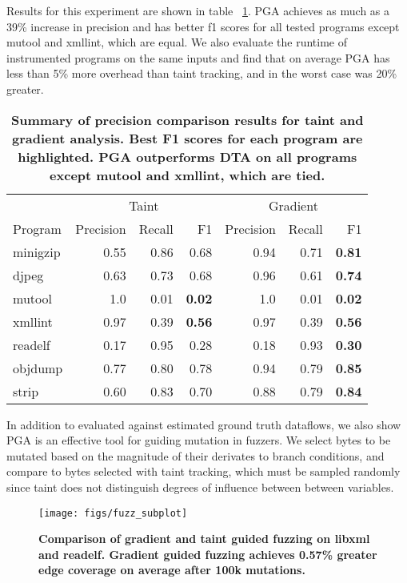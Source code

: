 \documentclass[conference]{IEEEtran}
\newcommand{\ttbf}[1]  {{\ttfamily\fontseries{m}\selectfont #1}}
\begin{document}
  Results for this experiment are shown in table ~\ref{tab:precision_comp}. PGA achieves as much as a 39\% increase in precision and has better f1 scores for all tested programs except \ttbf{mutool} and \ttbf{xmllint}, which are equal. We also evaluate the runtime of instrumented programs on the same inputs and find that on average PGA has less than 5\% more overhead than taint tracking, and in the worst case was 20\% greater.


\begin{table}
{\small
  \begin{tabular}{p{0.9cm}rrrrrr} 
 \toprule
     & \multicolumn{3}{c}{Taint} & \multicolumn{3}{c}{Gradient} \\ 
    Program & Precision & Recall & F1 & Precision & Recall & F1 \\ 
 \midrule
minigzip &0.55& 0.86 &0.68& 0.94& 0.71 & {\bf 0.81}\\ 
djpeg &0.63&0.73&0.68&0.96&0.61&{\bf 0.74}\\
mutool&1.0&0.01&\textbf{0.02}&1.0&0.01& \textbf{0.02}\\
xmllint & 0.97 & 0.39 & \textbf{0.56}  & 0.97 & 0.39 & \textbf{0.56}\\
readelf &0.17&0.95&0.28&0.18&0.93 & {\bf 0.30} \\
objdump &0.77&0.80&0.78&0.94&0.79& {\bf 0.85}\\
strip &0.60&0.83&0.70&0.88&0.79& {\bf 0.84} \\
 \bottomrule
 \end{tabular} }
  \caption{\label{tab:precision_comp}\textbf{Summary of precision comparison results for taint and gradient analysis. Best F1 scores for each program are highlighted. PGA outperforms DTA on all programs except mutool and xmllint, which are tied.}}
 \vspace{-20pt}
\end{table}

In addition to evaluated against estimated ground truth dataflows, we also show PGA is an effective tool for guiding mutation in fuzzers. We select bytes to be mutated based on the magnitude of their derivates to branch conditions, and compare to bytes selected with taint tracking, which must be sampled randomly since taint does not distinguish degrees of influence between between variables.

\begin{figure}
  \centering
    \texttt{[image: figs/fuzz\_subplot]}
  \vspace{-10pt}
   \caption{ \textbf{Comparison of gradient and taint guided fuzzing on \ttbf{libxml} and \ttbf{readelf}. Gradient guided fuzzing achieves 0.57\% greater edge coverage on average after 100k mutations.}}
  \label{fig:ex_funcs}
  \vspace{-15pt}
\end{figure}
\end{document}
